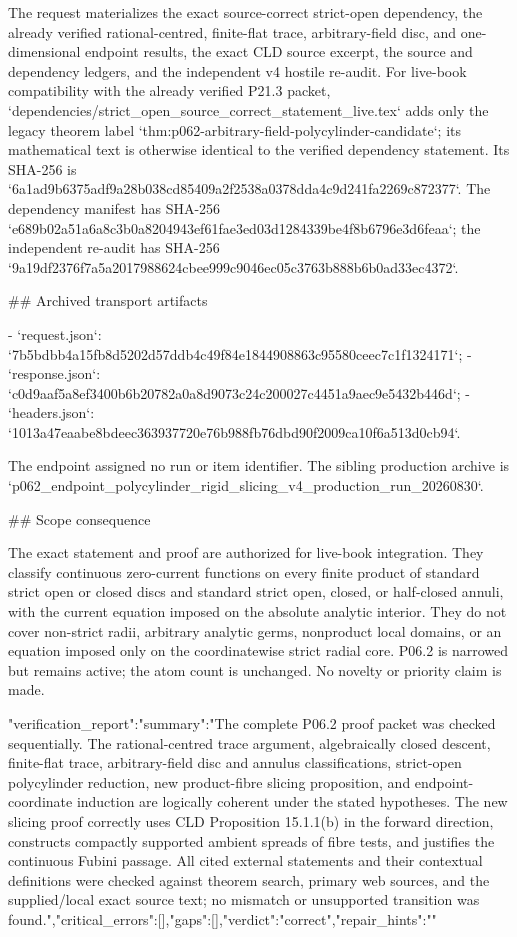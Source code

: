 The request materializes the exact source-correct strict-open dependency,
the already verified rational-centred, finite-flat trace, arbitrary-field
disc, and one-dimensional endpoint results, the exact CLD source excerpt,
the source and dependency ledgers, and the independent v4 hostile re-audit.
For live-book compatibility with the already verified P21.3 packet,
`dependencies/strict_open_source_correct_statement_live.tex` adds only the
legacy theorem label
`thm:p062-arbitrary-field-polycylinder-candidate`; its mathematical text is
otherwise identical to the verified dependency statement.  Its SHA-256 is
`6a1ad9b6375adf9a28b038cd85409a2f2538a0378dda4c9d241fa2269c872377`.
The dependency manifest has SHA-256
`e689b02a51a6a8c3b0a8204943ef61fae3ed03d1284339be4f8b6796e3d6feaa`;
the independent re-audit has SHA-256
`9a19df2376f7a5a2017988624cbee999c9046ec05c3763b888b6b0ad33ec4372`.

## Archived transport artifacts

- `request.json`:
  `7b5bdbb4a15fb8d5202d57ddb4c49f84e1844908863c95580ceec7c1f1324171`;
- `response.json`:
  `c0d9aaf5a8ef3400b6b20782a0a8d9073c24c200027c4451a9aec9e5432b446d`;
- `headers.json`:
  `1013a47eaabe8bdeec363937720e76b988fb76dbd90f2009ca10f6a513d0cb94`.

The endpoint assigned no run or item identifier.  The sibling production
archive is
`p062_endpoint_polycylinder_rigid_slicing_v4_production_run_20260830`.

## Scope consequence

The exact statement and proof are authorized for live-book integration.
They classify continuous zero-current functions on every finite product of
standard strict open or closed discs and standard strict open, closed, or
half-closed annuli, with the current equation imposed on the absolute
analytic interior.  They do not cover non-strict radii, arbitrary analytic
germs, nonproduct local domains, or an equation imposed only on the
coordinatewise strict radial core.  P06.2 is narrowed but remains active;
the atom count is unchanged.  No novelty or priority claim is made.

{"verification_report":{"summary":"The complete P06.2 proof packet was checked sequentially. The rational-centred trace argument, algebraically closed descent, finite-flat trace, arbitrary-field disc and annulus classifications, strict-open polycylinder reduction, new product-fibre slicing proposition, and endpoint-coordinate induction are logically coherent under the stated hypotheses. The new slicing proof correctly uses CLD Proposition 15.1.1(b) in the forward direction, constructs compactly supported ambient spreads of fibre tests, and justifies the continuous Fubini passage. All cited external statements and their contextual definitions were checked against theorem search, primary web sources, and the supplied/local exact source text; no mismatch or unsupported transition was found.","critical_errors":[],"gaps":[]},"verdict":"correct","repair_hints":""}

